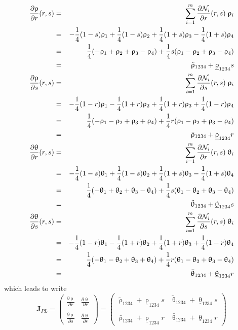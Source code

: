 \begin{eqnarray}
\frac{\partial\uprho}{\partial r}(r,s)   
&=& \sum_{i=1}^m \frac{\partial{\mathcal{N}}_i}{\partial r}(r,s)\; \uprho_i   \nonumber\\
&=&-\frac14 (1-s)\uprho_1 + \frac14 (1-s)\uprho_2 + \frac14 (1+s)\uprho_3 - \frac14 (1+s)\uprho_4 \nonumber\\
&=& \frac14 (-\uprho_1 + \uprho_2 + \uprho_3 - \uprho_4) 
+\frac14 s (\uprho_1 - \uprho_2 + \uprho_3 - \uprho_4) \nonumber\\
&=& \tilde{\uprho}_{1234} + \underline{\uprho}_{1234} s
\nonumber\\
\frac{\partial\uprho}{\partial s}(r,s)   
&=& \sum_{i=1}^m \frac{\partial{\mathcal{N}}_i}{\partial s}(r,s)\; \uprho_i    \nonumber\\
&=& -\frac14 (1-r)\uprho_1 - \frac14(1+r) \uprho_2 + \frac14(1+r) \uprho_3 + \frac14 (1-r)\uprho_4  \nonumber\\
&=& \frac14 (-\uprho_1 - \uprho_2 + \uprho_3 + \uprho_4) 
+ \frac14 r (\uprho_1 - \uprho_2 + \uprho_3 - \uprho_4) \nonumber\\
&=& \bar{\uprho}_{1234} + \underline{\uprho}_{1234} r 
\nonumber\\
\frac{\partial\uptheta}{\partial r}(r,s) 
&=& \sum_{i=1}^m \frac{\partial{\mathcal{N}}_i}{\partial r}(r,s)\; \uptheta_i \nonumber\\
&=& -\frac14 (1-s) \uptheta_1 + \frac14 (1-s)\uptheta_2 + \frac14(1+s) \uptheta_3 - \frac14(1+s) \uptheta_4 \nonumber\\
&=& \frac14 (-\uptheta_1 + \uptheta_2 + \uptheta_3 - \uptheta_4) 
+\frac14 s(\uptheta_1-\uptheta_2+\uptheta_3-\uptheta_4) \nonumber\\
&=&\tilde{\uptheta}_{1234} + \underline{\uptheta}_{1234}s
\nonumber\\
\frac{\partial\uptheta}{\partial s}(r,s) 
&=& \sum_{i=1}^m \frac{\partial{\mathcal{N}}_i}{\partial s}(r,s)\; \uptheta_i  \nonumber\\
&=&-\frac14 (1-r)\uptheta_1 - \frac14(1+r) \uptheta_2 + \frac14 (1+r)\uptheta_3 + \frac14(1-r) \uptheta_4 \nonumber\\
&=& \frac14 (-\uptheta_1 - \uptheta_2 + \uptheta_3 + \uptheta_4)  
+\frac14 r (\uptheta_1 -\uptheta_2  +\uptheta_3 -\uptheta_4 ) \nonumber\\
&=& \bar{\uptheta}_{1234} + \underline{\uptheta}_{1234}r \nonumber
\end{eqnarray}
which leads to write
\[
{\bm J}_{PL}=
\left(
\begin{array}{cc}
\frac{\partial \uprho}{\partial r} & \frac{\partial \uptheta}{\partial r} \\ \\
\frac{\partial \uprho}{\partial s} & \frac{\partial \uptheta}{\partial s} 
\end{array}
\right)
=
\left(
\begin{array}{cc}
\tilde{\uprho}_{1234} + \underline{\uprho}_{1234} s 
& \tilde{\uptheta}_{1234} + \underline{\uptheta}_{1234}s \\ \\
\bar{\uprho}_{1234} + \underline{\uprho}_{1234} r  
& \bar{\uptheta}_{1234} + \underline{\uptheta}_{1234}r 
\end{array}
\right)
\]
